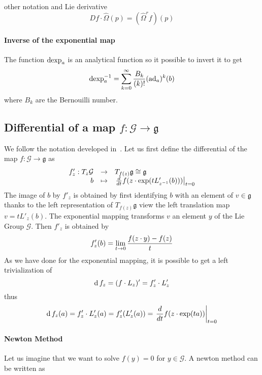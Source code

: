 \begin{ndrva}
  other notation and Lie derivative
  \begin{equation}
    \label{eq:178}
      Df \cdot \widehat \Omega (p) = (\widehat \Omega^r f )(p) 
  \end{equation}
\end{ndrva}



\paragraph{Inverse of the exponential map}


The function $\operatorname{dexp}_{a}$ is an analytical function so it possible to invert it to get
\begin{equation}
  \label{eq:45}
  \operatorname{dexp}^{-1}_{a} = \sum_{k=0}^\infty \frac{B_k}{(k)!} (\operatorname{ad}_a)^k(b) 
\end{equation}
where $B_k$ are the Bernouilli number.

\subsection{Differential of a map $f : \mathcal G \rightarrow \mathfrak g$}

We follow the notation developed in~\cite{Owren.Welfert_BIT2000}. Let us first define the differential of the map $f : \mathcal G \rightarrow \mathfrak g$ as
\begin{equation}
  \label{eq:166}
  \begin{array}[rcl]{rcl}
    f'_z : T_z\mathcal G &\rightarrow&T_{f(z)}\mathfrak g \cong  \mathfrak g\\
    b &\mapsto& \left.\frac{d}{dt} f(z\glaw \exp(t L'_{z^{-1}}(b))) \right|_{t=0}
  \end{array}
\end{equation}
The image of $b$ by $f'_z$   is obtained by first identifying $b$ with an element of $v \in \mathfrak g$ thanks to the left representation of $T_{f(z)}\mathfrak g$ view the left translation map $v= t L'_z(b)$. The exponential mapping transforms $v$ an element $y$ of the Lie Group $\mathcal G$. Then $f'_z$ is obtained by
\begin{equation}
  \label{eq:167}
  f'_z(b) = \lim_{t\rightarrow 0} \frac{f(z\cdot y) - f(z)}{t}
\end{equation}
As we have done for the exponential mapping, it is possible to get a left trivialization of  
\begin{equation}
  \label{eq:169}
  \operatorname{d} f_z = (f\cdot L_z)' = f'_z \cdot L'_z
\end{equation}
thus
\begin{equation}
  \label{eq:170}
  \operatorname{d} f_z (a) =  f'_z \cdot L'_z(a) = f'_z(L'_z(a)) =  \left.\frac{d}{dt} f(z\cdot \exp(t a )) \right|_{t=0}
\end{equation}

\paragraph{Newton Method}
Let us imagine that we want to solve $f(y) = 0 $ for $y \in \mathcal G$. A newton method can be written as 

